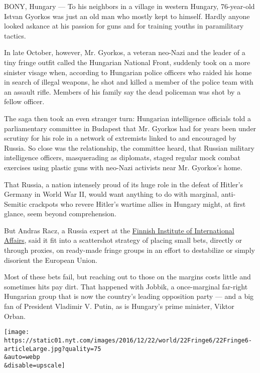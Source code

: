BONY, Hungary --- To his neighbors in a village in western Hungary,
76-year-old Istvan Gyorkos was just an old man who mostly kept to
himself. Hardly anyone looked askance at his passion for guns and for
training youths in paramilitary tactics.

In late October, however, Mr. Gyorkos, a veteran neo-Nazi and the leader
of a tiny fringe outfit called the Hungarian National Front, suddenly
took on a more sinister visage when, according to Hungarian police
officers who raided his home in search of illegal weapons, he shot and
killed a member of the police team with an assault rifle. Members of his
family say the dead policeman was shot by a fellow officer.

The saga then took an even stranger turn: Hungarian intelligence
officials told a parliamentary committee in Budapest that Mr. Gyorkos
had for years been under scrutiny for his role in a network of
extremists linked to and encouraged by Russia. So close was the
relationship, the committee heard, that Russian military intelligence
officers, masquerading as diplomats, staged regular mock combat
exercises using plastic guns with neo-Nazi activists near Mr. Gyorkos's
home.

That Russia, a nation intensely proud of its huge role in the defeat of
Hitler's Germany in World War II, would want anything to do with
marginal, anti-Semitic crackpots who revere Hitler's wartime allies in
Hungary might, at first glance, seem beyond comprehension.

But Andras Racz, a Russia expert at the
\href{http://www.fiia.fi/en/\#tab1}{Finnish Institute of International
Affairs}, said it fit into a scattershot strategy of placing small bets,
directly or through proxies, on ready-made fringe groups in an effort to
destabilize or simply disorient the European Union.

Most of these bets fail, but reaching out to those on the margins costs
little and sometimes hits pay dirt. That happened with Jobbik, a
once-marginal far-right Hungarian group that is now the country's
leading opposition party --- and a big fan of President Vladimir V.
Putin, as is Hungary's prime minister, Viktor Orban.

\texttt{[image: https://static01.nyt.com/images/2016/12/22/world/22Fringe6/22Fringe6-articleLarge.jpg?quality=75\\\&auto=webp\\\&disable=upscale]}


